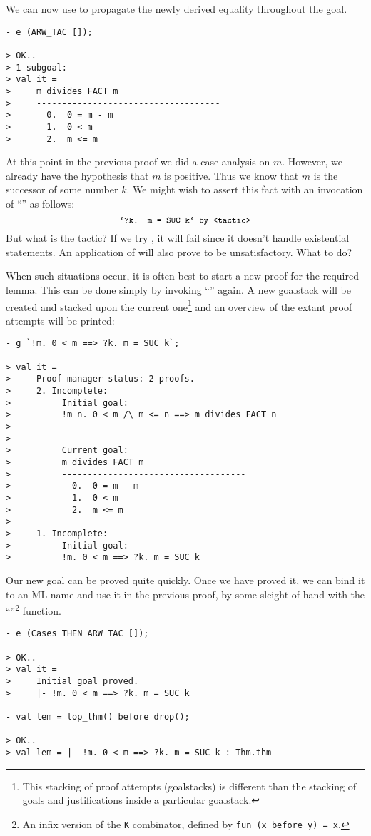 We can now use  to propagate the newly derived equality
throughout the goal.
\begin{session}\begin{verbatim}
- e (ARW_TAC []);

> OK..
> 1 subgoal:
> val it =
>     m divides FACT m
>     ------------------------------------
>       0.  0 = m - m
>       1.  0 < m
>       2.  m <= m
\end{verbatim}\end{session}
    At this point in the previous proof we did a case analysis on $m$.
    However, we already have the hypothesis that $m$ is positive. Thus
    we know that $m$ is the successor of some number $k$. We might
    wish to assert this fact with an invocation of ``'' as
    follows:
\[
    \mbox{\ml{`?k. m = SUC k` by <tactic>}}
\]
But what is the tactic? If we try , it will fail since
it doesn't handle existential statements. An application of
 will also prove to be unsatisfactory. What to do?

When such situations occur, it is often best to start a new proof for
the required lemma. This can be done simply by invoking ``''
again. A new goalstack will be created and stacked upon the current
one\footnote{This stacking of proof attempts (goalstacks) is different
  than the stacking of goals and justifications inside a particular
  goalstack.}  and an overview of the extant proof attempts will be
printed:
\begin{session}\begin{verbatim}
- g `!m. 0 < m ==> ?k. m = SUC k`;

> val it =
>     Proof manager status: 2 proofs.
>     2. Incomplete:
>          Initial goal:
>          !m n. 0 < m /\ m <= n ==> m divides FACT n
>
>
>          Current goal:
>          m divides FACT m
>          ------------------------------------
>            0.  0 = m - m
>            1.  0 < m
>            2.  m <= m
>
>     1. Incomplete:
>          Initial goal:
>          !m. 0 < m ==> ?k. m = SUC k
\end{verbatim}\end{session}
    Our new goal can be proved quite quickly. Once we have proved it,
    we can bind it to an ML name and use it in the previous proof, by
    some sleight of hand with the ``''\footnote{An infix
      version of the {\tt K} combinator, defined by {\tt fun (x before
        y) = x}.} function.
\begin{session}\begin{verbatim}
- e (Cases THEN ARW_TAC []);

> OK..
> val it =
>     Initial goal proved.
>     |- !m. 0 < m ==> ?k. m = SUC k

- val lem = top_thm() before drop();

> OK..
> val lem = |- !m. 0 < m ==> ?k. m = SUC k : Thm.thm
\end{verbatim}\end{session}

